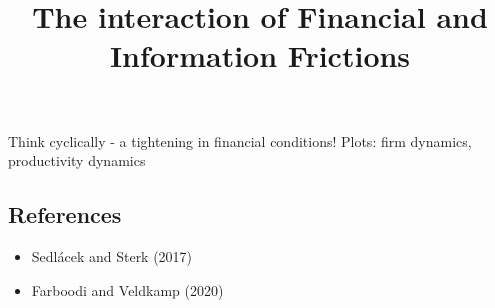 \documentclass[12pt]{article}
\title{The interaction of Financial and Information Frictions}
\author{}
\date{}
\begin{document}
\maketitle

Think cyclically - a tightening in financial conditions! 
Plots: firm dynamics, productivity dynamics

\subsection*{References}
\begin{itemize}\setlength\itemsep{0em} \small
    \item Sedlácek and Sterk (2017)
    \item Farboodi and Veldkamp (2020)
\end{itemize}
\end{document}
